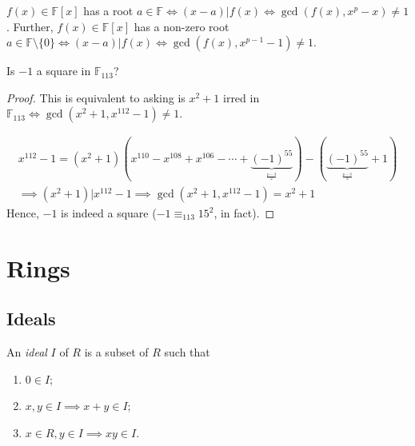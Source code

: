 \documentclass[12pt,oneside]{article}
\begin{document}
\begin{proposition}
  $f(x) \in \mathbb{F}[x]$ has a root $a \in \mathbb{F} \iff (x-a)|f(x) \iff \gcd (f(x), x^p - x) \neq 1$. Further, $f(x) \in \mathbb{F}[x]$ has a non-zero root $a \in \mathbb{F}\setminus \{0\} \iff (x-a) | f(x) \iff \gcd (f(x), x^{p-1} - 1) \neq 1$.
\end{proposition}

\begin{example}
  Is $-1$ a square in $\mathbb{F}_{113}$? \footnotemark
\end{example}


\begin{proof}
  This is equivalent to asking is $x^2 + 1$ irred in $\mathbb{F}_{113} \iff \gcd (x^2 + 1, x^{112} - 1) \neq 1$.

  \begin{align*}
    x^{112} - 1 = (x^2 + 1)(x^{110} - x^{108}+x^{106} - \cdots + \underbrace{(-1)^{55}}_{^\frac{p-3}{2}}) - (\underbrace{(-1)^{55}}_{^\frac{p-3}{2}} + 1)\\
    \implies (x^2+1)| x^{112} -1 \implies \gcd(x^2 + 1, x^{112} - 1) = x^2 +1
  \end{align*}
  Hence, $-1$ is indeed a square ($-1 \equiv_{113} 15^2$, in fact).
\end{proof}

\section{Rings}

\subsection{Ideals}

\begin{definition}[Ideal]\label{def:ideal}
  An \emph{ideal} $I$ of $R$ is a subset of $R$ such that 
  \begin{enumerate}
    \item $0 \in I$;
    \item $x,y \in I \implies x + y \in I$;
    \item $x \in R, y \in I \implies xy \in I$.\footnotemark 
  \end{enumerate}
\end{definition}
\end{document}
